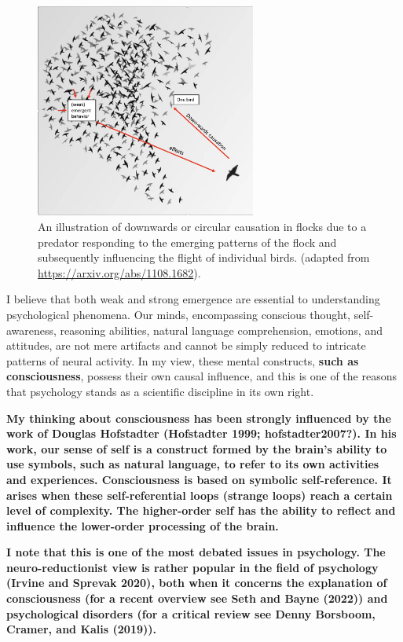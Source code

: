 \documentclass[
  letterpaper,
]{scrbook}
\begin{document}
\begin{figure}

{\centering \includegraphics[width=2.85742in,height=2.77537in]{media/ch1/image4.jpg}

}

\caption{\label{fig-ch1-img4}An illustration of downwards or circular
causation in flocks due to a predator responding to the emerging
patterns of the flock and subsequently influencing the flight of
individual birds. (adapted from \url{https://arxiv.org/abs/1108.1682}).}

\end{figure}

I believe that both weak and strong emergence are essential to
understanding psychological phenomena. Our minds, encompassing conscious
thought, self-awareness, reasoning abilities, natural language
comprehension, emotions, and attitudes, are not mere artifacts and
cannot be simply reduced to intricate patterns of neural activity. In my
view, these mental constructs, \textbf{such as consciousness}, possess
their own causal influence, and this is one of the reasons that
psychology stands as a scientific discipline in its own right.

\textbf{My thinking about consciousness has been strongly influenced by
the work of Douglas Hofstadter (Hofstadter 1999;
\textbf{hofstadter2007?}). In his work, our sense of self is a construct
formed by the brain's ability to use symbols, such as natural language,
to refer to its own activities and experiences. Consciousness is based
on symbolic self-reference. It arises when these self-referential loops
(strange loops) reach a certain level of complexity. The higher-order
self has the ability to reflect and influence the lower-order processing
of the brain.}

\textbf{I note that this is one of the most debated issues in
psychology. The neuro-reductionist view is rather popular in the field
of psychology (Irvine and Sprevak 2020), both when it concerns the
explanation of consciousness (for a recent overview see Seth and Bayne
(2022)) and psychological disorders (for a critical review see Denny
Borsboom, Cramer, and Kalis (2019)).}
\end{document}
